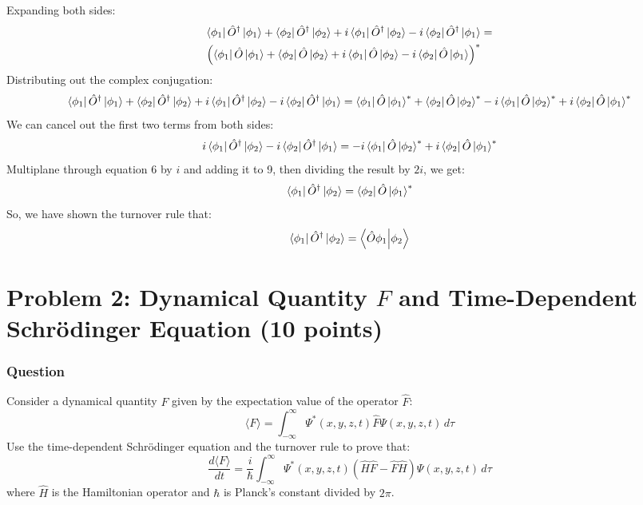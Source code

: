 \documentclass{article}
\begin{document}
Expanding both sides:
\begin{align*}
    \bra{\phi _{1}}\hat{O}^\dagger\ket{\phi _{1}} + \bra{\phi _{2}}\hat{O}^\dagger\ket{\phi _{2}} + i\bra{\phi _{1}}\hat{O}^\dagger\ket{\phi _{2}} -i \bra{\phi _{2}}\hat{O}^\dagger\ket{\phi _{1}} &= \\ \left(\bra{\phi _{1}} \hat{O}\ket{\phi _{1}} + \bra{\phi _{2}} \hat{O}\ket{\phi _{2}} + i\bra{\phi _{1}} \hat{O}\ket{\phi _{2}} -i \bra{\phi _{2}} \hat{O}\ket{\phi _{1}}\right)^*
\end{align*}
Distributing out the complex conjugation:
\begin{equation}
    \bra{\phi _{1}}\hat{O}^\dagger\ket{\phi _{1}} + \bra{\phi _{2}}\hat{O}^\dagger\ket{\phi _{2}} + i\bra{\phi _{1}}\hat{O}^\dagger\ket{\phi _{2}} -i \bra{\phi _{2}}\hat{O}^\dagger\ket{\phi _{1}} = \bra{\phi _{1}} \hat{O}\ket{\phi _{1}}^* + \bra{\phi _{2}} \hat{O}\ket{\phi _{2}}^* - i\bra{\phi _{1}} \hat{O}\ket{\phi _{2}}^* +i \bra{\phi _{2}} \hat{O}\ket{\phi _{1}}^*
\end{equation}
We can cancel out the first two terms from both sides:
\begin{equation}
    i\bra{\phi _{1}}\hat{O}^\dagger\ket{\phi _{2}} -i \bra{\phi _{2}}\hat{O}^\dagger\ket{\phi _{1}} = - i\bra{\phi _{1}} \hat{O}\ket{\phi _{2}}^* +i \bra{\phi _{2}} \hat{O}\ket{\phi _{1}}^*
\end{equation}
Multiplane through equation 6 by $i$ and adding it to 9, then dividing the result by $2i$, we get:
\begin{equation}
    \bra{\phi _{1}}\hat{O}^\dagger\ket{\phi _{2}} = \bra{\phi _{2}} \hat{O}\ket{\phi _{1}}^*
\end{equation}
So, we have shown the turnover rule that:
\begin{equation}
    \bra{\phi _{1}}\hat{O}^\dagger\ket{\phi _{2}}= \bra{\hat{O} \phi _{1}}\ket{\phi _{2}}
\end{equation}


\section{Problem 2: Dynamical Quantity $F$ and Time-Dependent Schrödinger Equation (10 points)}
\subsubsection{Question}
Consider a dynamical quantity $F$ given by the expectation value of the operator $\hat{F}$:
\begin{equation*}
    \langle F \rangle = \int_{-\infty}^{\infty} \Psi^*(x, y, z, t)\hat{F}\Psi(x, y, z, t)\,d\tau 
\end{equation*}
Use the time-dependent Schrödinger equation and the turnover rule to prove that:
\begin{equation*}
    \frac{d\langle F \rangle}{dt} = \frac{i}{\hbar} \int_{-\infty}^{\infty} \Psi^*(x, y, z, t)(\hat{H}\hat{F} - \hat{F}\hat{H})\Psi(x, y, z, t)\,d\tau
\end{equation*}
where $\hat{H}$ is the Hamiltonian operator and $\hbar$ is Planck's constant divided by $2\pi$.
\end{document}
